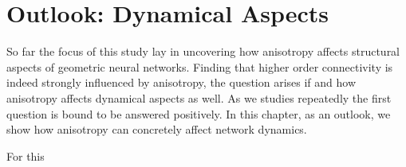 \chapter{Outlook: Dynamical Aspects}\label{ch:dynamical_aspects}

So far the focus of this study lay in uncovering how anisotropy
affects structural aspects of geometric neural networks. Finding that
higher order connectivity is indeed strongly influenced by anisotropy,
the question arises if and how anisotropy affects dynamical aspects as
well. As we studies repeatedly the first question is bound to be
answered positively. In this chapter, as an outlook, we show how
anisotropy can concretely affect network dynamics.



For this 















% 
% 














